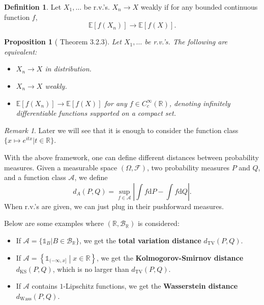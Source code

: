 \documentclass[openany]{book}
\newtheorem{proposition}{Proposition}[chapter]
\theoremstyle{definition}
\newtheorem{definition}{Definition}[chapter]
\theoremstyle{remark}
\newtheorem*{remark}{Remark}
\begin{document}
\begin{definition}
    Let $X_1,\ldots$ be r.v.'s. $X_n\to X$ weakly if for any bounded continuous function $f$,
    \begin{equation*}
        \mathbb{E}\left[f(X_n)\right]\to \mathbb{E}\left[f(X)\right].
    \end{equation*}
\end{definition}
\begin{proposition}[\cite{D10} Theorem 3.2.3]
    Let $X_1,\ldots$ be r.v.'s. The following are equivalent:
    \begin{itemize}
        \item $X_n\to X$ in distribution.
        \item $X_n\to X$ weakly.
        \item $\mathbb{E}\left[f(X_n)\right]\to \mathbb{E}\left[f(X)\right]$ for any $f\in C_c^{\infty}(\mathbb{R})$, denoting infinitely differentiable functions supported on a compact set.
    \end{itemize}
\end{proposition}
\begin{remark}
    Later we will see that it is enough to consider the function class $\{x\mapsto e^{itx}|t\in \mathbb{R}\}$.
\end{remark}

With the above framework, one can define different distances between probability measures. Given a measurable space $(\Omega,\mathcal{F})$, two probability measures $P$ and $Q$, and a function class $\mathcal{A}$, we define
\begin{equation*}
    d_A(P,Q)=\sup_{f\in \mathcal{\mathcal{A}}}\left|\int f \mathrm{d}P-\int f \mathrm{d}Q\right|.
\end{equation*}
When r.v.'s are given, we can just plug in their pushforward measures.

Below are some examples where $(\mathbb{R},\mathcal{B}_{\mathbb{R}})$ is considered:
\begin{itemize}
    \item If $\mathcal{A}=\{\mathds{1}_B|B\in \mathcal{B}_{\mathbb{R}}\}$, we get the \textbf{total variation distance} $d_{\mathrm{TV}}(P,Q)$.

    \item If $\mathcal{A}=\left\{\mathds{1}_{(-\infty,x]}\middle|x\in \mathbb{R}\right\}$, we get the \textbf{Kolmogorov-Smirnov distance} $d_{\mathrm{KS}}(P,Q)$, which is no larger than $d_{\mathrm{TV}}(P,Q)$.

    \item If $\mathcal{A}$ contains $1$-Lipschitz functions, we get the \textbf{Wasserstein distance} $d_{\mathrm{Wass}}(P,Q)$.
\end{itemize}
\end{document}
